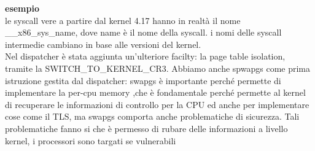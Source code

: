 \documentclass[12pt, oneside]{extbook}
\begin{document}
\textbf{esempio}\\
le syscall vere a partire dal kernel 4.17 hanno in realtà il nome \_\_x86\_sys\_name, dove name è il nome della syscall. i nomi delle syscall intermedie cambiano in base alle versioni del kernel.
\\ Nel dispatcher è stata aggiunta un'ulteriore facilty: la page table isolation, tramite la \textsf{SWITCH\_TO\_KERNEL\_CR3}. Abbiamo anche spwapgs come prima istruzione gestita dal dispatcher: swapgs è importante perché permette di implementare la per-cpu memory ,che è fondamentale perché permette al kernel di recuperare le informazioni di controllo per la CPU ed anche per implementare cose come il TLS, ma swapgs comporta anche problematiche di sicurezza. Tali problematiche fanno si che è permesso di rubare delle informazioni a livello kernel, i processori sono targati se vulnerabili
\end{document}
